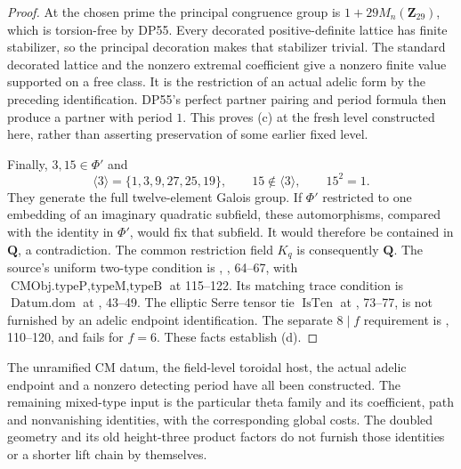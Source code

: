 \begin{proof}
At the chosen prime the principal congruence group is
$1+29M_n(\mathbf Z_{29})$, which is torsion-free by DP55.
Every decorated positive-definite lattice has finite stabilizer,
so the principal decoration makes that stabilizer trivial.
The standard decorated lattice and the nonzero extremal coefficient
give a nonzero finite value supported on a free class.
It is the restriction of an actual adelic form by the preceding
identification. DP55's perfect partner pairing and period formula
then produce a partner with period $1$.
This proves (c) at the fresh level constructed here, rather than
asserting preservation of some earlier fixed level.

Finally, $3,15\in\Phi'$ and
\[
 \langle3\rangle=\{1,3,9,27,25,19\},\qquad
 15\notin\langle3\rangle,\qquad15^2=1.
\]
They generate the full twelve-element Galois group.
If $\Phi'$ restricted to one embedding of an imaginary quadratic
subfield, these automorphisms, compared with the identity in
$\Phi'$, would fix that subfield. It would therefore be contained
in $\mathbf Q$, a contradiction. The common restriction field
$K_q$ is consequently $\mathbf Q$.
The source's uniform two-type condition is
,
, 64--67, with
$\operatorname{CMObj.typeP,typeM,typeB}$ at 115--122.
Its matching trace condition is $\operatorname{Datum.dom}$ at
, 43--49.
The elliptic Serre tensor tie $\operatorname{IsTen}$ at
, 73--77, is not furnished by an adelic
endpoint identification.
The separate $8\mid f$ requirement is
, 110--120,
and fails for $f=6$.
These facts establish (d).
\end{proof}

The unramified CM datum, the field-level toroidal host, the actual
adelic endpoint and a nonzero detecting period have all been constructed.
The remaining mixed-type input is the particular theta family and its
coefficient, path and nonvanishing identities, with the corresponding
global costs. The doubled geometry and its old height-three product
factors do not furnish those identities or a shorter lift chain by
themselves.
